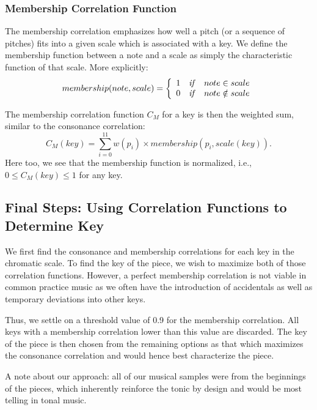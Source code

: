 \documentclass[11pt]{article}
\begin{document}
\subsubsection{Membership Correlation Function}
The membership correlation emphasizes how well a pitch (or a sequence of pitches) fits into a given scale which is associated with a key. We define the membership function between a note and a scale as simply the characteristic function of that scale. More explicitly:
\begin{equation}
membership(note, scale) =  \left\{
\begin{array}{ccc}
1 & \text{\emph{if}} & note \in scale \\
0 & \text{\emph{if}} & note \notin scale \\
\end{array}
\right.
\end{equation}

The membership correlation function $C_M$ for a key is then the weighted sum, similar to the consonance correlation:
\begin{equation}
	C_M(key) = \sum_{i=0}^{11} w(p_i) \times membership(p_i, scale(key)).
\end{equation}
Here too, we see that the membership function is normalized, i.e., $0\leq C_M(key) \leq 1$ for any key.

\subsection{Final Steps: Using Correlation Functions to Determine Key}
We first find the consonance and membership correlations for each key in the chromatic scale. To find the key of the piece, we wish to maximize both of those correlation functions. However, a perfect membership correlation is not viable in common practice music as we often have the introduction of accidentals as well as temporary deviations into other keys. 

Thus, we settle on a threshold value of 0.9 for the membership correlation. All keys with a membership correlation lower than this value are discarded. The key of the piece is then chosen from the remaining options as that which maximizes the consonance correlation and would hence best characterize the piece.

A note about our approach: all of our musical samples were from the beginnings of the pieces, which inherently reinforce the tonic by design and would be most telling in tonal music.
\end{document}

